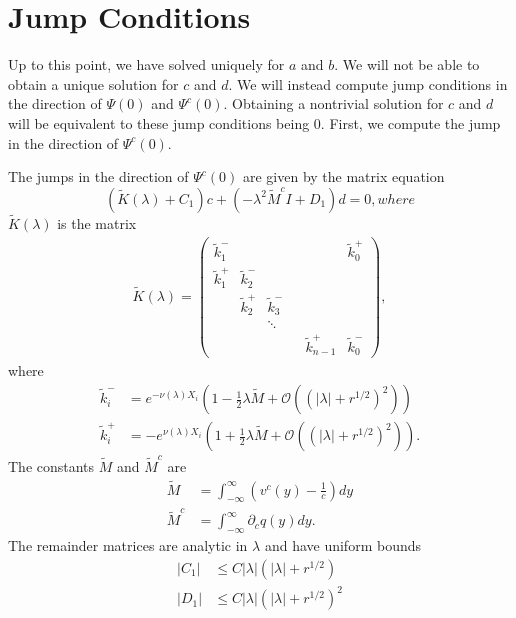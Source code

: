 \documentclass[thesis.tex]{subfiles}
\begin{document}
\section{Jump Conditions}

Up to this point, we have solved uniquely for $a$ and $b$. We will not be able to obtain a unique solution for $c$ and $d$. We will instead compute jump conditions in the direction of $\Psi(0)$ and $\Psi^c(0)$. Obtaining a nontrivial solution for $c$ and $d$ will be equivalent to these jump conditions being 0. First, we compute the jump in the direction of $\Psi^c(0)$. 

\begin{lemma}\label{jumpcenteradj}
The jumps in the direction of $\Psi^c(0)$ are given by the matrix equation
\begin{equation}\label{matrixjumpc}
\left( \tilde{K}(\lambda) + C_1 \right) c + (-\lambda^2 \tilde{M}^c I + D_1) d = 0, where
\end{equation}
$\tilde{K}(\lambda)$ is the matrix
\begin{align*}
\tilde{K}(\lambda) =  
\begin{pmatrix}
\tilde{k}_1^- & & & & & \tilde{k}_0^+ \\
\tilde{k}_1^+ & \tilde{k}_2^- \\
& \tilde{k}_2^+ & \tilde{k}_3^- \\
  & & \ddots & && \\
& & & & \tilde{k}_{n-1}^+ & \tilde{k}_0^-
\end{pmatrix},
\end{align*}
where
\begin{align*}
\tilde{k}_i^- &= e^{-\nu(\lambda)X_i}\left(1 - \frac{1}{2}\lambda \tilde{M} + \mathcal{O}((|\lambda| + r^{1/2})^2) \right) \\
\tilde{k}_i^+ &= -e^{\nu(\lambda)X_i}\left(1 + \frac{1}{2}\lambda \tilde{M} + \mathcal{O}((|\lambda| + r^{1/2})^2) \right).
\end{align*}
The constants $\tilde{M}$ and $\tilde{M}^c$ are
\begin{align*}
\tilde{M} &= \int_{-\infty}^{\infty} \left(v^c(y) - \frac{1}{c}\right) dy \\
\tilde{M}^c &= \int_{-\infty}^\infty \partial_c q(y) dy.
\end{align*}
The remainder matrices are analytic in $\lambda$ and have uniform bounds
\begin{align}\label{centerjumprem}
|C_1| &\leq C |\lambda|(|\lambda| + r^{1/2}) \\
|D_1| &\leq C |\lambda|(|\lambda| + r^{1/2})^2
\end{align}


\end{lemma}
\end{document}
